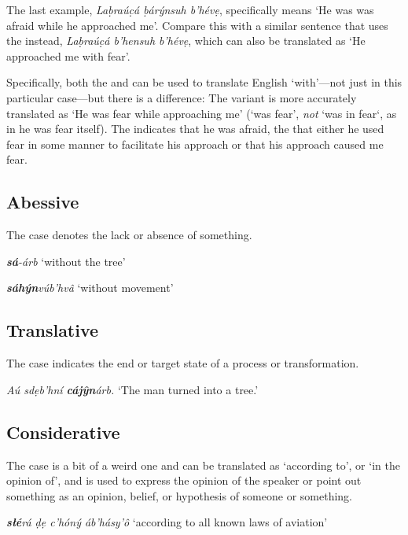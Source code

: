 \documentclass[a4paper, 12pt, twoside, openright, final]{book}
\def \b {ḅ}
\let \w \textit
\let \b \textbf
\begin{document}
The last example, \w{Laḅraúc̣á ḅárýnsuh b’hévẹ}, specifically means ‘He was was afraid while he approached me’. Compare this
with a similar sentence that uses the  instead, \w{Laḅraúc̣á b’hensuh b’hévẹ}, which can also be translated as
‘He approached me with fear’.

Specifically, both the  and 
can be used to translate English ‘with’—not just in this particular case—but there is a difference: The  variant
is more accurately translated
as ‘He was fear while approaching me’ (‘was fear’, \textit{not} ‘was in fear‘, as in he was fear itself). The 
indicates that he was afraid, the  that either he used fear in some manner to facilitate his approach
or that his approach caused me fear.

\subsection{Abessive}
The  case denotes the lack or absence of something.
\begin{examples}
    \item \w{\b{sá}-árb} ‘without the tree’
    \item \w{\b{sáhýn}vúb’hvâ} ‘without movement’
\end{examples}

\subsection{Translative}
The  case indicates the end or target state of a process or transformation.
\begin{examples}
    \item \w{Aú sdẹb’hní \b{cájŷn}árb.} ‘The man turned into a tree.’
\end{examples}

\subsection{Considerative}
The  case is a bit of a weird one and can be translated as ‘according to’, or ‘in the opinion of’, and is used to
express the opinion of the speaker or point out something as an opinion, belief, or hypothesis of someone or something.
\begin{examples}
    \item \w{\b{słé}rá ḍẹ c’hóný áb’hásy’ô} ‘according to all known laws of aviation’
\end{examples}
\end{document}
